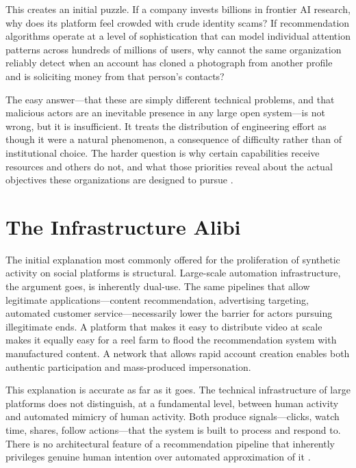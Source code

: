 \documentclass[12pt,a4paper]{article}
\begin{document}
This creates an initial puzzle. If a company invests billions in frontier AI research, why does
its platform feel crowded with crude identity scams? If recommendation algorithms operate at a
level of sophistication that can model individual attention patterns across hundreds of millions
of users, why cannot the same organization reliably detect when an account has cloned a photograph
from another profile and is soliciting money from that person's contacts?

The easy answer---that these are simply different technical problems, and that malicious actors
are an inevitable presence in any large open system---is not wrong, but it is insufficient. It
treats the distribution of engineering effort as though it were a natural phenomenon, a consequence
of difficulty rather than of institutional choice. The harder question is why certain capabilities
receive resources and others do not, and what those priorities reveal about the actual objectives
these organizations are designed to pursue \citep{tufekci2015}.

\section{The Infrastructure Alibi}

The initial explanation most commonly offered for the proliferation of synthetic activity on social
platforms is structural. Large-scale automation infrastructure, the argument goes, is inherently
dual-use. The same pipelines that allow legitimate applications---content recommendation,
advertising targeting, automated customer service---necessarily lower the barrier for actors
pursuing illegitimate ends. A platform that makes it easy to distribute video at scale makes it
equally easy for a reel farm to flood the recommendation system with manufactured content. A
network that allows rapid account creation enables both authentic participation and mass-produced
impersonation.

This explanation is accurate as far as it goes. The technical infrastructure of large platforms
does not distinguish, at a fundamental level, between human activity and automated mimicry of
human activity. Both produce signals---clicks, watch time, shares, follow actions---that the
system is built to process and respond to. There is no architectural feature of a recommendation
pipeline that inherently privileges genuine human intention over automated approximation of it
\citep{pariser2011,vosoughi2018}.
\end{document}
